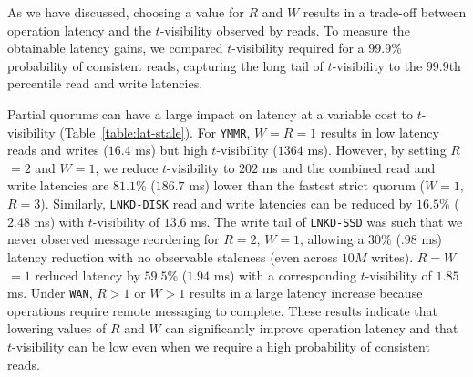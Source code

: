 \documentclass{vldb}
\begin{document}
As we have discussed, choosing a value for $R$ and $W$ results in a
trade-off between operation latency and the $t$-visibility observed by
reads. To measure the obtainable latency gains, we compared
$t$-visibility required for a $99.9\%$ probability of consistent
reads, capturing the long tail of $t$-visibility to the $99.9$th
percentile read and write latencies.

Partial quorums can have a large impact on latency at a variable cost
to $t$-visibility (Table~\ref{table:lat-stale}).  For \texttt{YMMR},
$W$$=$$R$$=$$1$ results in low latency reads and writes ($16.4$ ms)
but high $t$-visibility ($1364$ ms). However, by setting $R$$=$$2$ and
$W$$=$$1$, we reduce $t$-visibility to $202$ ms and the combined read
and write latencies are $81.1\%$ ($186.7$ ms) lower than the fastest
strict quorum ($W$$=$$1$, $R$$=$$3$).  Similarly, \texttt{LNKD-DISK}
read and write latencies can be reduced by $16.5\%$ ($2.48$ ms) with
$t$-visibility of $13.6$ ms.  The write tail of \texttt{LNKD-SSD} was
such that we never observed message reordering for $R$$=$$2$,
$W$$=$$1$, allowing a $30\%$ ($.98$ ms) latency reduction with no
observable staleness (even across $10M$ writes).  $R$$=$$W$$=$$1$
reduced latency by $59.5\%$ ($1.94$ ms) with a corresponding
$t$-visibility of $1.85$ ms.  Under \texttt{WAN}, $R > 1$ or $W > 1$
results in a large latency increase because operations require
remote messaging to complete. These results indicate that lowering
values of $R$ and $W$ can significantly improve operation latency and
that $t$-visibility can be low even when we require a high probability
of consistent reads.
\end{document}
